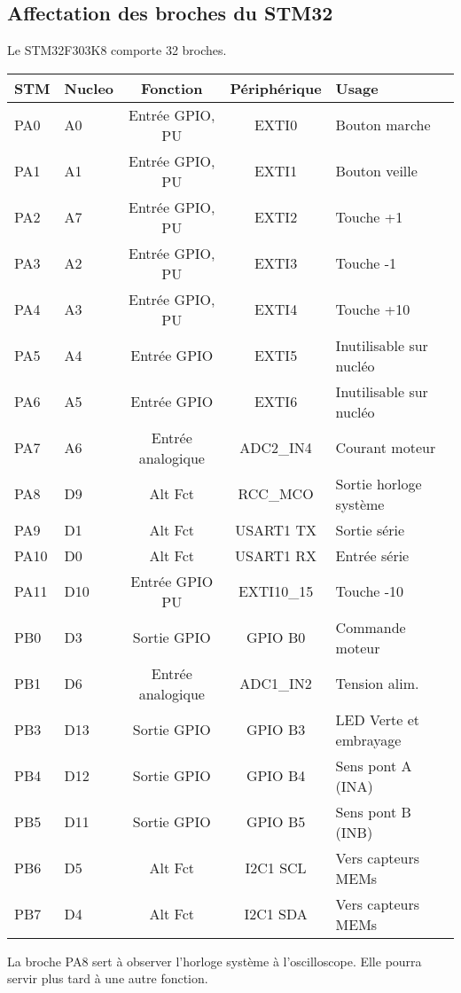 \documentclass[a4paper,11pt]{report}
\begin{document}
\subsection{Affectation des broches du STM32}
Le STM32F303K8 comporte 32 broches.
\\
   \begin{tabular}{|l|l|c|c|l|}
   \hline
   STM & Nucleo& Fonction & Périphérique & Usage\\
   \hline
   PA0  & A0  & Entrée GPIO, PU   & EXTI0       & Bouton marche          \\
   PA1  & A1  & Entrée GPIO, PU   & EXTI1       & Bouton veille          \\
   PA2  & A7  & Entrée GPIO, PU   & EXTI2       & Touche +1              \\
   PA3  & A2  & Entrée GPIO, PU   & EXTI3       & Touche -1              \\
   PA4  & A3  & Entrée GPIO, PU   & EXTI4       & Touche +10             \\
   PA5  & A4  & Entrée GPIO       & EXTI5       & Inutilisable sur nucléo\\

   PA6  & A5  & Entrée GPIO       & EXTI6       & Inutilisable sur nucléo\\
   PA7  & A6  & Entrée analogique & ADC2\_IN4   & Courant moteur         \\
   PA8  & D9  & Alt Fct \no 0     & RCC\_MCO    & Sortie horloge système \\
   PA9  & D1  & Alt Fct \no 7     & USART1 TX   & Sortie série           \\
   PA10 & D0  & Alt Fct \no 7     & USART1 RX   & Entrée série           \\
   PA11 & D10 & Entrée GPIO PU    & EXTI10\_15  & Touche -10             \\
   PB0  & D3  & Sortie GPIO       & GPIO B0     & Commande moteur        \\
   PB1  & D6  & Entrée analogique & ADC1\_IN2   & Tension alim.          \\
   PB3  & D13 & Sortie GPIO       & GPIO B3     & LED Verte et embrayage \\
   PB4  & D12 & Sortie GPIO       & GPIO B4     & Sens pont A (INA)      \\
   PB5  & D11 & Sortie GPIO       & GPIO B5     & Sens pont B (INB)      \\
   PB6  & D5  & Alt Fct \no 4     & I2C1 SCL    & Vers capteurs MEMs     \\
   PB7  & D4  & Alt Fct \no 4     & I2C1 SDA    & Vers capteurs MEMs     \\
   \hline
\end{tabular}
   La broche PA8 sert à observer l'horloge système à l'oscilloscope. Elle pourra servir plus tard à une autre fonction.
\end{document}
